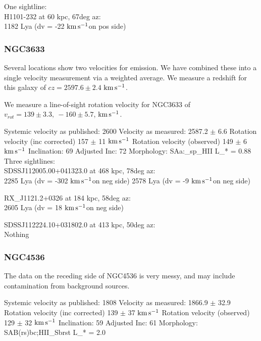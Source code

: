 \documentclass[iop]{emulateapj-rtx4}
\newcommand{\kms}{$\rm km\, s^{-1}$}
\begin{document}
One sightline: \\
H1101-232 at 60 kpc, 67deg az: \\
1182 Lya (dv = -22 \kms on pos side)


\subsubsection{NGC3633}
Several locations show two velocities for emission. We have combined these into a single velocity measurement via a weighted average. We measure a redshift for this galaxy of $cz = 2597.6 \pm 2.4$ \kms.

We measure a line-of-sight rotation velocity for NGC3633 of $v_{rot}=139\pm 3.3,~-160\pm5.7$,  \kms.


Systemic velocity as published: 2600
Velocity as measured: 2587.2 $\pm$ 6.6
Rotation velocity (inc corrected) 157 $\pm$ 11 \kms
Rotation velocity (observed) 149 $\pm$ 6 \kms
Inclination: 69
Adjusted Inc: 72
Morphology: SAa:_sp_HII
L_{\**} = 0.88 \\

Three sightlines: \\
SDSSJ112005.00+041323.0 at 468 kpc, 78deg az: \\
2285 Lya (dv = -302 \kms on neg side)
2578 Lya (dv = -9 \kms on neg side)


RX_J1121.2+0326 at 184 kpc, 58deg az: \\
2605 Lya (dv = 18 \kms on neg side)


SDSSJ112224.10+031802.0 at 413 kpc, 50deg az: \\
Nothing


\subsubsection{NGC4536}
The data on the receding side of NGC4536 is very messy, and may include contamination from background sources. 



Systemic velocity as published: 1808
Velocity as measured: 1866.9 $\pm$ 32.9
Rotation velocity (inc corrected) 139 $\pm$ 37 \kms
Rotation velocity (observed) 129 $\pm$ 32 \kms
Inclination: 59
Adjusted Inc: 61
Morphology: SAB(rs)bc;HII_Sbrst
L_{\**} = 2.0 \\
\end{document}
